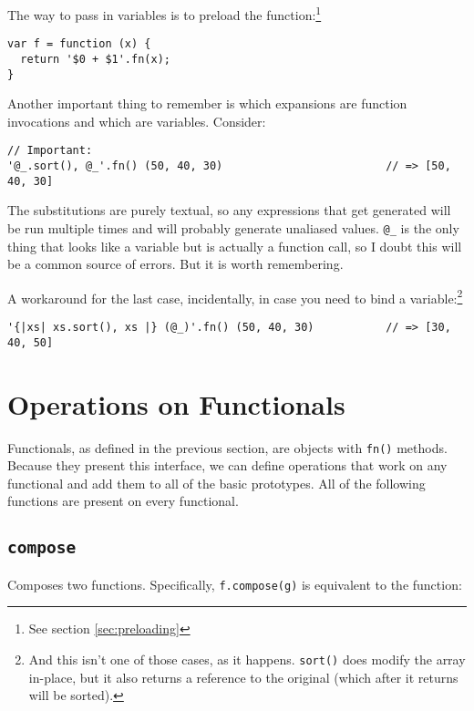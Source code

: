 \documentclass{report}
\begin{document}
      The way to pass in variables is to preload the function:\footnote{See section \ref{sec:preloading}}

\begin{verbatim}
var f = function (x) {
  return '$0 + $1'.fn(x);
}
\end{verbatim}

      Another important thing to remember is which expansions are function invocations and which are variables. Consider:

\begin{verbatim}
// Important:
'@_.sort(), @_'.fn() (50, 40, 30)                         // => [50, 40, 30]
\end{verbatim}

      The substitutions are purely textual, so any expressions that get generated will be run multiple times and will probably generate unaliased values. \verb|@_| is the only thing that looks
      like a variable but is actually a function call, so I doubt this will be a common source of errors. But it is worth remembering.

      A workaround for the last case, incidentally, in case you need to bind a variable:\footnote{And this isn't one of those cases, as it happens. {\tt sort()} does modify the array in-place,
      but it also returns a reference to the original (which after it returns will be sorted).}

\begin{verbatim}
'{|xs| xs.sort(), xs |} (@_)'.fn() (50, 40, 30)           // => [30, 40, 50]
\end{verbatim}

\chapter {Operations on Functionals}
    \label{sec:operations-on-functionals}

    Functionals, as defined in the previous section, are objects with \verb|fn()| methods. Because they present this interface, we can define operations that work on any functional and add
    them to all of the basic prototypes. All of the following functions are present on every functional.

\section {{\tt compose}}
      \label{sec:compose}
      Composes two functions. Specifically, \verb|f.compose(g)| is equivalent to the function:
      
\end{document}
